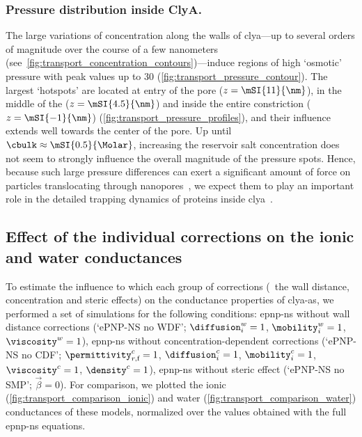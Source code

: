 \subsubsection{Pressure distribution inside ClyA.}
%
The large variations of \Na{} concentration along the walls of \gls{clya}---up to several orders of magnitude
over the course of a few nanometers (see~\cref{fig:transport_concentration_contours})---induce regions of high
`osmotic' pressure with peak values up to \SI{30}{\atm} (\cref{fig:transport_pressure_contour}). The largest
`hotspots' are located at \cisi{} entry of the pore ($z = \mSI{11}{\nm}$), in the middle of the \lumen{} ($z =
\mSI{4.5}{\nm}$) and inside the entire constriction ($z = \mSI{-1}{\nm}$)
(\cref{fig:transport_pressure_profiles}), and their influence extends well towards the center of the pore. Up
until $\cbulk \approx \mSI{0.5}{\Molar}$, increasing the reservoir salt concentration does not seem to
strongly influence the overall magnitude of the pressure spots. Hence, because such large pressure differences
can  exert a significant amount of force on particles translocating through nanopores~\cite{Hoogerheide-2014},
we expect them to play an important role in the detailed trapping dynamics of proteins inside
\gls{clya}~\cite{Soskine-Biesemans-2015,Willems-Ruic-Biesemans-2019}.


\subsection{Effect of the individual corrections on the ionic and water conductances}
%
\label{sec:transport:comparison_corrections}
%

To estimate the influence to which each group of corrections (\ie~the wall distance, concentration and steric
effects) on the conductance properties of \gls{clya-as}, we performed a set of simulations for the following
conditions: \gls{epnp-ns} without wall distance corrections (`ePNP-NS no WDF'; $\diffusion_{i}^w=1$,
$\mobility_{i}^w=1$, $\viscosity^w=1$), \gls{epnp-ns} without concentration-dependent corrections (`ePNP-NS no
CDF'; $\permittivity_{r,\text{f}}^c=1$, $\diffusion_{i}^c=1$, $\mobility_{i}^c=1$, $\viscosity^c=1$,
$\density^c=1$), \gls{epnp-ns} without steric effect (`ePNP-NS no SMP'; $\vec{\beta}=0$). For comparison, we
plotted the ionic (\cref{fig:transport_comparison_ionic}) and water (\cref{fig:transport_comparison_water})
conductances of these models, normalized over the values obtained with the full \gls{epnp-ns} equations.

